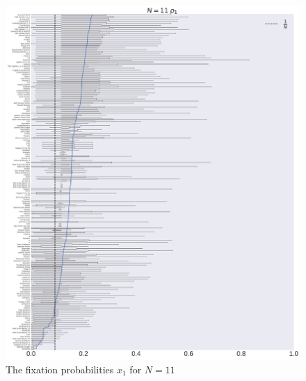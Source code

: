 \documentclass[10pt,letterpaper]{article}
\begin{document}
\begin{figure}[!hbtp]
    \centering
    \includegraphics[width=\textwidth]{./boxplot_11_invade.pdf}
    \caption{The fixation probabilities \(x_1\) for \(N=11\)}
\end{figure}
\end{document}
